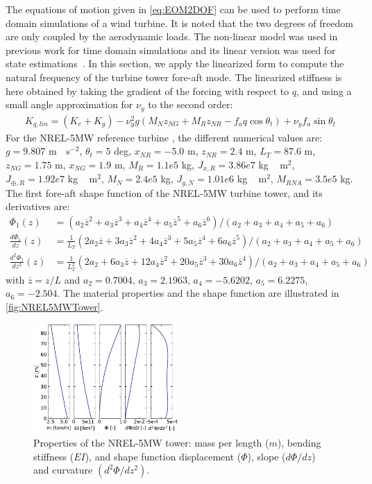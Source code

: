 \documentclass[wes, manuscript]{copernicus}
\renewcommand{\bar}{\overline}
\begin{document}
The equations of motion given in \autoref{eq:EOM2DOF} can be used to perform time domain simulations of a wind turbine. It is noted that the two degrees of freedom are only coupled by the aerodynamic loads. The non-linear model was used in previous work for time domain simulations and its linear version was used for state estimations~\citep{Branlard:2020twin,Branlard:2020twinOF}. In this section, we apply the linearized form to compute the natural frequency of the turbine tower fore-aft mode.
The linearized stiffness is here obtained by taking the gradient of the forcing with respect to $q$, and using a small angle approximation for $\nu_y$ to the second order:
\begin{align}
K_{q,lin}= (K_{e} + K_g)
- \nu_{y}^{2} g \left(M_N z_{NG} + M_{R} z_{NR} - f_a q \cos\theta_t\right)
+ \nu_{y} f_a \sin\theta_t 
\end{align}
For the NREL-5MW reference turbine \citep{nrel5mw}, the different numerical values are:
$g=9.807$ \unit{m\cdot s}$^{-2}$,
$\theta_t=5$ \unit{deg},
$x_{NR}=-5.0$ \unit{m},
$z_{NR}= 2.4$ \unit{m},
$L_T=87.6$ \unit{m},
$z_{NG}=1.75$ \unit{m},
$x_{NG}=1.9$ \unit{m},
$M_R= 1.1e5$ \unit{kg},
$J_{x,R}=3.86e7$ \unit{kg\,m}$^2$,
$J_{\oplus,R}=1.92e7$ \unit{kg\,m}$^2$,
$M_N=2.4e5$ \unit{kg},
$J_{y,N} =1.01e6$ \unit{kg\,m}$^2$,
$M_{RNA}=3.5e5$ \unit{kg}.
The first fore-aft shape function of the NREL-5MW turbine tower, and its derivatives are:
\begin{align}
   \Phi_1(z) &= (a_2 \bar{z}^2+ a_3 \bar{z}^3+ a_4 \bar{z}^4+ a_5 \bar{z}^5+ a_6 \bar{z}^6)/(a_2+a_3+a_4+a_5+a_6)\nonumber \\
   \frac{d\Phi_1}{dz}(z) &= \frac{1}{L_T}(2a_2 \bar{z}+ 3a_3 \bar{z}^2+ 4a_4 \bar{z}^3+ 5a_5 \bar{z}^4+ 6a_6 \bar{z}^5)/(a_2+a_3+a_4+a_5+a_6)\label{eq:ShapeFunctionsPoly}  \\  
   \frac{d^2\Phi_1}{dz^2}(z) &= \frac{1}{L_T^2}(2a_2+ 6a_3 \bar{z}+ 12a_4 \bar{z}^2+ 20a_5 \bar{z}^3+ 30a_6 \bar{z}^4)/(a_2+a_3+a_4+a_5+a_6) 
   \nonumber
\end{align}
with $\bar{z}=z/L$ and $a_2=0.7004$, $ a_3=2.1963$, $a_4=-5.6202$, $a_5=6.2275$, $a_6=-2.504$.
The material properties and the shape function are illustrated in \autoref{fig:NREL5MWTower}. 
\noindent\begin{figure}[!htb]\centering%
  \includegraphics[width=0.49\textwidth]{figs/NREL5MWTower.pdf}
  \caption{Properties of the NREL-5MW tower: mass per length ($m$), bending stiffness ($EI$), and shape function displacement ($\Phi$), slope ($d\Phi/dz$) and curvature $(d^2\Phi/dz^2)$.}\label{fig:NREL5MWTower}%
\end{figure}
\end{document}

